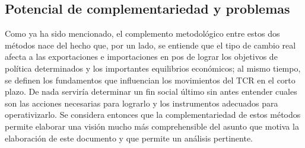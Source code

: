 \documentclass[12pt,letterpaper]{article}
\begin{document}

\subsection*{Potencial de complementariedad y problemas}

Como ya ha sido mencionado, el complemento metodológico entre estos dos métodos nace del hecho que, por un lado, se entiende que el tipo de cambio real afecta a las exportaciones e importaciones en pos de lograr los objetivos de política determinados y los importantes equilibrios económicos; al mismo tiempo, se definen los fundamentos que influencian los movimientos del TCR en el corto plazo. De nada serviría determinar un fin social último sin antes entender cuales son las acciones necesarias para lograrlo y los instrumentos adecuados para operativizarlo. Se considera entonces que la complementariedad de estos métodos permite elaborar una visión mucho más comprehensible del asunto que motiva la elaboración de este documento y que permite un análisis pertinente.
\end{document}
